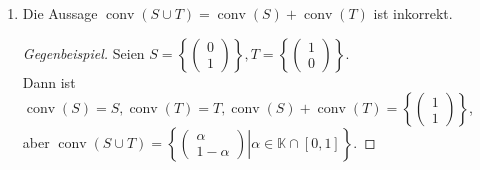 \documentclass[a4paper,10pt,german]{scrartcl}
\newcommand{\dann}{\ensuremath{\Rightarrow}}
\newcommand{\K}{\ensuremath{\mathbb{K}}}
\newcommand{\N}{\ensuremath{\mathbb{N}}}
\newcommand{\one}{\ensuremath{{\mathds{1}}}}
\newcommand{\divec}[2]{\ensuremath{\left(\begin{array}{cc}
                                    #1\\
                                    #2
                                   \end{array}\right)
                                   }}
\DeclareMathOperator*{\conv}{conv}
\DeclareMathOperator*{\aff}{aff}
\newenvironment{ggbsp}{\begin{proof}[Gegenbeispiel]}{ \end{proof}}
\begin{document}
\begin{enumerate}
\begin{proof}
\begin{itemize}
\begin{align*}
      &x=\sum\limits_{i=1}^k\lambda_i(s_i+t_i)\\
      \dann&\exists k\in\N,\lambda\in \K^k\text{ mit }\lambda^T\one=1, s_1,\dots,s_k\in S,t_1,\dots,t_k\in T:\\
      &x=\sum\limits_{i=1}^k\lambda_is_i+\sum\limits_{i=1}^k\lambda_it_i\\
      \stackrel{\text{Def. }\aff}\dann&\exists s'\in\aff(S),t'\in \aff(T):x=s'+t'\\
      \dann&x\in\aff(S)+\aff(T)
     \end{align*}
    \item[{,,$\supseteq$}'']
     \begin{align*}
      &\text{Sei }x\in\aff(S)+\aff(T)\\
      \dann\exists& k,l\in\N,\alpha\in \K^k,\beta\in\K^l\text{ mit }\alpha^T\one=1,\beta^T\one=1,s_1,\dots,s_k\in S,t_1,\dots,t_l\in T:\\
      x&=\sum\limits_{i=1}^k\alpha_i s_i+\sum\limits_{i=1}^l\beta_i t_i\\
      \intertext{ \footnotesize Sei o.B.d.A.  $k=l$ ($k<l\dann\alpha_{k+1}=\dots=\alpha_l=0, s_{k+1}=\dots=s_l=s_k,\,k>l$ analog).}
      \dann\exists& k\in\N,\alpha,\beta\in \K^k\text{ mit }\alpha^T\one=1,\beta^T\one=1,s_1,\dots,s_k\in S,t_1,\dots,t_k\in T:\\
      x&=\sum\limits_{i=1}^k\alpha_i s_i+\sum\limits_{i=1}^l\beta_i t_i\\
      &=\sum\limits_{i=1}^k\left(-\frac1k(s_i+t_i)+\underbrace{\sum\limits_{j=1}^k\frac{\alpha_i+\beta_j}k(s_i+t_j)}
      _{\text{insges.:\,}\sum\limits_{m=1}^k(\alpha_m+\frac1k)s_m+(\beta_m+\frac1k)t_m}\right)\\
      \intertext{Setze $u_{i,j}:=s_i+t_j \in S+T,\gamma_{i,j}:=\frac{\alpha_i+\beta_j}{k},\delta_i=-\frac1k'\in\K$, wobei gilt:}
      &\ \sum\limits_{i=1}^k\sum\limits_{j=1}^k\gamma_{i,j}+\sum\limits_{i=1}^k\delta_i=\sum\limits_{i=1}^k\left(\alpha_i+\frac1k\right)-1=1+1-1=1\\
      \intertext{Es gilt also:}
      x&=\sum\limits_{i=1}^k\sum\limits_{j=1}^k\gamma_{i,j}u_{i,j}+\sum\limits_{i=1}^k\delta_iu_{i,i}
      \intertext{und dies ist eine affine Kombination aus $S+T$.}
     \end{align*}
   \end{itemize}
  \end{proof}
 \item Die Aussage $\conv(S\cup T)= \conv(S)+\conv(T)$ ist inkorrekt.
  \begin{ggbsp}
   Seien $S=\left\{\divec{0}{1}\right\},T=\left\{\divec{1}{0}\right\}$.\\
   Dann ist $\conv(S)=S,\conv(T)=T,\conv(S)+\conv(T)=\left\{\divec{1}{1}\right\}$,\\
   aber $\conv(S\cup T)=\left.\left\{\divec{\alpha}{1-\alpha}\right|\alpha\in\K\cap[0,1]\right\}$.
  \end{ggbsp}
\end{enumerate}
\end{document}
